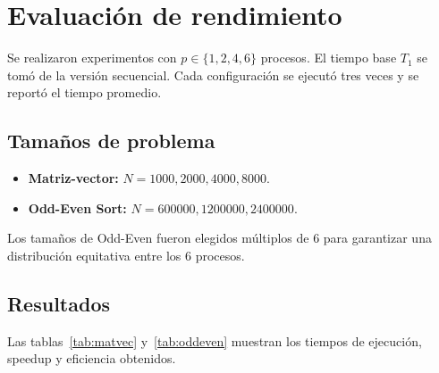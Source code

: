 \documentclass[12pt,a4paper]{article}
\begin{document}
\section{Evaluación de rendimiento}
\label{sec:rendimiento}

Se realizaron experimentos con $p \in \{1,2,4,6\}$ procesos. El tiempo base $T_1$ se tomó de la versión secuencial. Cada configuración se ejecutó tres veces y se reportó el tiempo promedio.

\subsection{Tamaños de problema}

\begin{itemize}
    \item \textbf{Matriz-vector:} $N = 1000, 2000, 4000, 8000$.
    \item \textbf{Odd-Even Sort:} $N = 600000, 1200000, 2400000$.
\end{itemize}

Los tamaños de Odd-Even fueron elegidos múltiplos de 6 para garantizar una distribución equitativa entre los 6 procesos.

\subsection{Resultados}

Las tablas~\ref{tab:matvec} y~\ref{tab:oddeven} muestran los tiempos de ejecución, speedup y eficiencia obtenidos.
\end{document}

